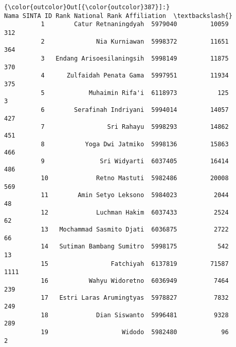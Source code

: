 \documentclass[11pt]{article}
\begin{document}
            \begin{Verbatim}[commandchars=\\\{\}]
{\color{outcolor}Out[{\color{outcolor}387}]:}                         Nama SINTA ID Rank National Rank Affiliation  \textbackslash{}
          1        Catur Retnaningdyah  5979040         10059              312   
          2              Nia Kurniawan  5998372         11651              364   
          3   Endang Arisoesilaningsih  5998149         11875              370   
          4      Zulfaidah Penata Gama  5997951         11934              375   
          5            Muhaimin Rifa'i  6118973           125                3   
          6        Serafinah Indriyani  5994014         14057              427   
          7                 Sri Rahayu  5998293         14862              451   
          8           Yoga Dwi Jatmiko  5998136         15863              466   
          9               Sri Widyarti  6037405         16414              486   
          10             Retno Mastuti  5982486         20008              569   
          11        Amin Setyo Leksono  5984023          2044               48   
          12             Luchman Hakim  6037433          2524               62   
          13   Mochammad Sasmito Djati  6036875          2722               66   
          14   Sutiman Bambang Sumitro  5998175           542               13   
          15                 Fatchiyah  6137819         71587             1111   
          16           Wahyu Widoretno  6036949          7464              239   
          17   Estri Laras Arumingtyas  5978827          7832              249   
          18             Dian Siswanto  5996481          9328              289   
          19                    Widodo  5982480            96                2   
          

\end{Verbatim}
\end{document}
